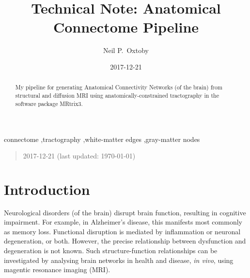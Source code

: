 \documentclass[12pt]{elsarticle}
\begin{document}
	\begin{frontmatter}
		\title{Technical Note: Anatomical Connectome Pipeline}
		\author{Neil P.\ Oxtoby}
		\address{Progression Of Neurological Disease (POND) group, Centre for Medical Image Computing, Dept.\ of Computer Science, University College London, London, United Kingdom}
    \date{2017-12-21}
		\begin{abstract}
			My pipeline for generating Anatomical Connectivity Networks (of the brain) from structural and diffusion MRI using anatomically-constrained tractography in the software package MRtrix3.
		\end{abstract}
		\begin{keyword}
			connectome \sep tractography \sep white-matter edges \sep gray-matter nodes
		\end{keyword}
	\end{frontmatter}

\begin{quote}
  {2017-12-21 (last updated: \today)}
\end{quote}
\section{Introduction}
Neurological disorders (of the brain) disrupt brain function, resulting in cognitive impairment. For example, in Alzheimer's disease, this manifests most commonly as memory loss. Functional disruption is mediated by inflammation or neuronal degeneration, or both. However, the precise relationship between dysfunction and degeneration is not known. Such structure-function relationships can be investigated by analysing brain networks in health and disease, \emph{in vivo}, using magentic resonance imaging (MRI).
\end{document}
